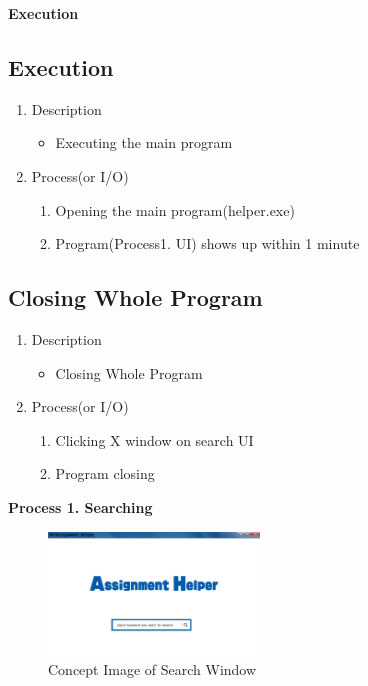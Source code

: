 \documentclass[conference]{IEEEtran}
\begin{document}
\begin{itemize}
\begin{itemize}
\begin{itemize}
\begin{itemize}
\textit{}

\textbf{Execution}

\subsection{Execution}
\begin{enumerate}
  \item Description
  \begin{itemize}
    \item Executing the main program
  \end{itemize}
  \item Process(or I/O)
  \begin{enumerate}
    \item Opening the main program(helper.exe)
    \item Program(Process1. UI) shows up within 1 minute
  \end{enumerate}
\end{enumerate}

\textit{}

\subsection{Closing Whole Program}
\begin{enumerate}
  \item Description
  \begin{itemize}
    \item Closing Whole Program
  \end{itemize}
  \item Process(or I/O)
  \begin{enumerate}
    \item Clicking X window on search UI
    \item Program closing
  \end{enumerate}
\end{enumerate}
\textit{}


%
\textbf{Process 1. Searching}


\textit{}
\begin{figure}[ht]
\centering
\includegraphics[width=0.5\textwidth]{./figures/UI_main.jpg}
\caption{Concept Image of Search Window}
\label{fig_concept_main}
\end{figure}



\end{itemize}
\end{itemize}
\end{itemize}
\end{itemize}
\end{document}
